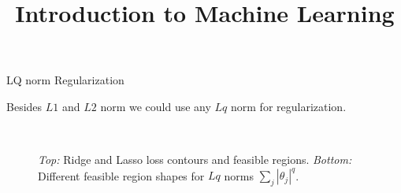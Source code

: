 \documentclass[11pt,compress,t,notes=noshow, xcolor=table]{beamer}
\title{Introduction to Machine Learning}
\date{}
\begin{document}

\begin{vbframe}{LQ norm Regularization} 

Besides $L1$ and $L2$ norm we could use any $Lq$ norm for regularization.

\begin{figure}
  \\
\caption{\textit{Top:} Ridge and Lasso loss contours and feasible regions.
  \textit{Bottom:} Different feasible region shapes for $Lq$ norms $\sum_j |\theta_j|^q$.}
\end{figure}
  
\end{vbframe}
\end{document}
